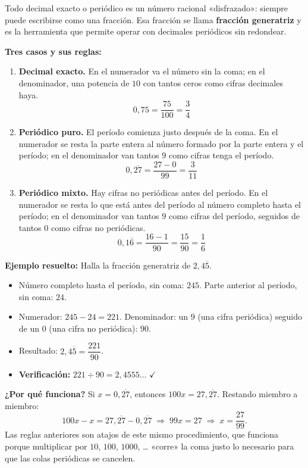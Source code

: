 \documentclass[12pt, letterpaper]{article}
\begin{document}
Todo decimal exacto o periódico es un número racional «disfrazado»: siempre puede escribirse como una fracción. Esa fracción se llama \textbf{fracción generatriz} y es la herramienta que permite operar con decimales periódicos sin redondear.

\begin{cuadroteoria}
  \textbf{Tres casos y sus reglas:}
  \begin{enumerate}[leftmargin=*, label=\arabic*.]
    \item \textbf{Decimal exacto.} En el numerador va el número sin la coma; en el denominador, una potencia de $10$ con tantos ceros como cifras decimales haya.
          $$0{,}75 = \frac{75}{100} = \frac{3}{4}$$

    \item \textbf{Periódico puro.} El período comienza justo después de la coma. En el numerador se resta la parte entera al número formado por la parte entera y el período; en el denominador van tantos $9$ como cifras tenga el período.
          $$0{,}\overline{27} = \frac{27 - 0}{99} = \frac{3}{11}$$

    \item \textbf{Periódico mixto.} Hay cifras no periódicas antes del período. En el numerador se resta lo que está antes del período al número completo hasta el período; en el denominador van tantos $9$ como cifras del período, seguidos de tantos $0$ como cifras no periódicas.
          $$0{,}1\overline{6} = \frac{16 - 1}{90} = \frac{15}{90} = \frac{1}{6}$$
  \end{enumerate}
\end{cuadroteoria}

\noindent\textbf{Ejemplo resuelto:} Halla la fracción generatriz de $2{,}4\overline{5}$.
\begin{itemize}
  \item Número completo hasta el período, sin coma: $245$. Parte anterior al período, sin coma: $24$.
  \item Numerador: $245 - 24 = 221$. Denominador: un $9$ (una cifra periódica) seguido de un $0$ (una cifra no periódica): $90$.
  \item Resultado: $2{,}4\overline{5} = \dfrac{221}{90}$.
  \item \textbf{Verificación:} $221 \div 90 = 2{,}4555\ldots$ $\checkmark$
\end{itemize}

\begin{cuadroextra}
  \textbf{¿Por qué funciona?} Si $x = 0{,}\overline{27}$, entonces $100x = 27{,}\overline{27}$. Restando miembro a miembro:
  $$100x - x = 27{,}\overline{27} - 0{,}\overline{27} \;\Rightarrow\; 99x = 27 \;\Rightarrow\; x = \frac{27}{99}.$$
  Las reglas anteriores son atajos de este mismo procedimiento, que funciona porque multiplicar por $10$, $100$, $1000$, \ldots{} «corre» la coma justo lo necesario para que las colas periódicas se cancelen.
\end{cuadroextra}
\end{document}
